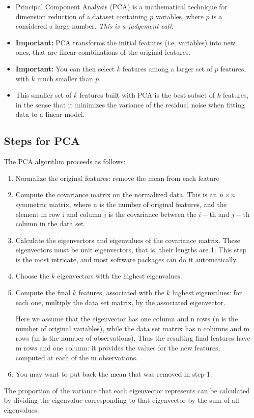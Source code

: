 \documentclass[a4paper,12pt]{article}
\begin{document}
\begin{itemize}
\item Principal Component Analysis (PCA) is a mathematical technique for dimension reduction of a dataset containing $p$ variables, where $p$ is a considered a large number. \textit{This is a judgement call.}
\item \textbf{Important:} PCA transforms the initial features (i.e. variables) into new ones, that are linear combinations of the original features. 

\item \textbf{Important:} You can then select $k$ features among a larger set of $p$ features, with $k$ much smaller than $p$.

\item This smaller set of $k$ features built with PCA is the best subset of $k$ features, in the sense that it minimizes the variance of the residual noise when fitting data to a linear model. 
\end{itemize}
\subsection*{Steps for PCA}

The PCA algorithm proceeds as follows:
\begin{enumerate}
    \item Normalize the original features: remove the mean from each  feature
\item Compute the covariance matrix on the normalized data. This is an 
$n \times  n$ symmetric matrix, where n is the number of original features, and the element in row i and column j is the covariance between the $i-$th and $j-$th column in the data set.  
\item Calculate the eigenvectors and eigenvalues of the covariance matrix. These eigenvectors must be unit eigenvectors, that is, their lengths are 1. This step is the most intricate, and most software packages can do it automatically.
\item Choose the $k$ eigenvectors with the highest eigenvalues.
\item Compute the final $k$ features, associated with the $k$ highest eigenvalues: for each one, multiply the data set matrix, by the associated eigenvector.

 Here we assume that the eigenvector has one column and n rows (n is the number of original variables), while the data set matrix has n columns and m rows (m is the number of observations), Thus the resulting final features have m rows and one column: it provides the values for the new features, computed at each of the m observations.
\item You may want to put back the mean that was removed in step 1.
\end{enumerate}
The proportion of the variance that each eigenvector represents can be calculated by dividing the eigenvalue corresponding to that eigenvector by the sum of all eigenvalues.
\end{document}
